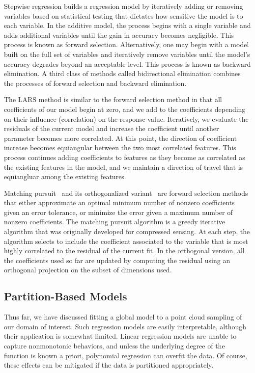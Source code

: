 Stepwise regression builds a regression model by iteratively adding or removing variables based on statistical testing that dictates how sensitive the model is to each variable.
%
In the additive model, the process begins with a single variable and adds additional variables until the gain in accuracy becomes negligible.
%
This process is known as forward selection.
%
Alternatively, one may begin with a model built on the full set of variables and iteratively remove variables until the model's accuracy degrades beyond an acceptable level.
%
This process is known as backward elimination.
%
A third class of methods called bidirectional elimination combines the processes of forward selection and backward elimination.

The LARS method is similar to the forward selection method in that all coefficients of our model begin at zero, and we add to the coefficients depending on their influence (correlation) on the response value.
%
Iteratively, we evaluate the residuals of the current model and increase the coefficient until another parameter becomes more correlated.
%
At this point, the direction of coefficient increase becomes equiangular between the two most correlated features.
%
This process continues adding coefficients to features as they become as correlated as the existing features in the model,
and we maintain a direction of travel that is equiangluar among the existing features.

Matching pursuit~\cite{MallatZhang1993} and its orthogonalized variant~\cite{DavisMallatZhang1994,PatiRezaiifarKrishnaprasad1993} are forward selection methods that either approximate an optimal minimum number of nonzero coefficients given an error tolerance, or minimize the error given a maximum number of nonzero coefficients.
%
The matching pursuit algorithm is a greedy iterative algorithm that was originally developed for compressed sensing.
%
At each step, the algorithm selects to include the coefficient associated to the variable that is most highly correlated to the residual of the current fit.
%
In the orthogonal version, all the coefficients used so far are updated by computing the residual using an orthogonal projection on the subset of dimensions used.

\subsection{Partition-Based Models}
Thus far, we have discussed fitting a global model to a point cloud sampling of our domain of interest.
%
Such regression models are easily interpretable, although their application is somewhat limited.
%
Linear regression models are unable to capture nonmonotonic behaviors, and unless the underlying degree of the function is known a priori, polynomial regression can overfit the data.
%
Of course, these effects can be mitigated if the data is partitioned appropriately.


